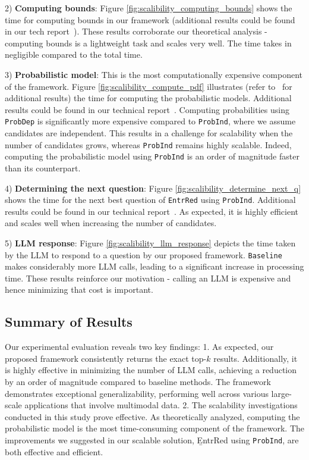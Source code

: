 2) \textbf{Computing bounds}: Figure \ref{fig:scalibility_computing_bounds} shows the time for computing bounds in our framework (additional results could be found in our tech report~\cite{tr}). These results corroborate our theoretical analysis - computing bounds is a lightweight task and scales very well. The time takes in negligible compared to the total time.

3) \textbf{Probabilistic model}: This is the most computationally expensive component of the framework. Figure \ref{fig:scalibility_compute_pdf} illustrates (refer to~\cite{tr} for additional results) the time for computing the probabilistic models. Additional results could be found in our technical report~\cite{tr}. Computing probabilities using {\tt ProbDep} is significantly more expensive compared to {\tt ProbInd}, where we assume candidates are independent. This results in a challenge for scalability when the number of candidates grows, whereas {\tt ProbInd} remains highly scalable. Indeed, computing the probabilistic model using {\tt ProbInd} is an order of magnitude faster than its counterpart.

4) \textbf{Determining the next question}: Figure \ref{fig:scalibility_determine_next_q} shows the time for the next best question of {\tt EntrRed} using {\tt ProbInd}. Additional results could be found in our technical report~\cite{tr}. As expected, it is highly efficient and scales well when increasing the number of candidates.

5) \textbf{LLM response}: Figure \ref{fig:scalibility_llm_response} depicts the time taken by the LLM to respond to a question by our proposed framework. {\tt Baseline} makes considerably more LLM calls, leading to a significant increase in processing time. These results reinforce our motivation - calling an LLM is expensive and hence minimizing that cost is important.

\subsection{Summary of Results}
Our experimental evaluation reveals two key findings: 1. As expected, our proposed framework consistently returns the exact top-$k$ results. Additionally, it is highly effective in minimizing the number of LLM calls, achieving a reduction by an order of magnitude compared to baseline methods. The framework demonstrates exceptional generalizability, performing well across various large-scale applications that involve multimodal data. 2. The scalability investigations conducted in this study prove effective. As theoretically analyzed, computing the probabilistic model is the most time-consuming component of the framework. The improvements we suggested in our scalable solution, {\b EntrRed} using {\tt ProbInd}, are both effective and efficient.


